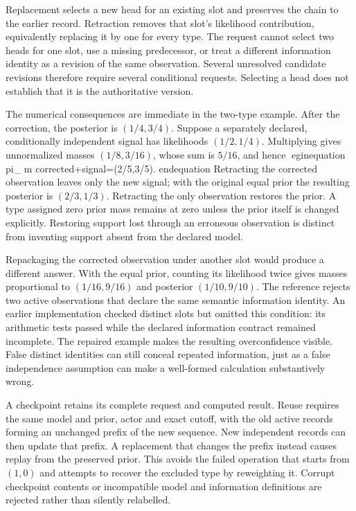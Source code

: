 Replacement selects a new head for an existing slot and preserves the chain
to the earlier record. Retraction removes that slot's likelihood contribution,
equivalently replacing it by one for every type. The request cannot select two
heads for one slot, use a missing predecessor, or treat a different information
identity as a revision of the same observation. Several unresolved candidate
revisions therefore require several conditional requests. Selecting a head
does not establish that it is the authoritative version.

The numerical consequences are immediate in the two-type example. After the
correction, the posterior is $(1/4,3/4)$. Suppose a separately declared,
conditionally independent signal has likelihoods $(1/2,1/4)$. Multiplying
gives unnormalized masses $(1/8,3/16)$, whose sum is $5/16$, and hence
egin{equation}
 pi_{
m corrected+signal}=(2/5,3/5).
end{equation}
Retracting the corrected observation leaves only the new signal; with the
original equal prior the resulting posterior is $(2/3,1/3)$. Retracting the
only observation restores the prior. A type assigned zero prior mass remains
at zero unless the prior itself is changed explicitly. Restoring support lost
through an erroneous observation is distinct from inventing support absent
from the declared model.

Repackaging the corrected observation under another slot would produce a
different answer. With the equal prior, counting its likelihood twice gives
masses proportional to $(1/16,9/16)$ and posterior $(1/10,9/10)$. The reference
rejects two active observations that declare the same semantic information
identity. An earlier implementation checked distinct slots but omitted this
condition: its arithmetic tests passed while the declared information
contract remained incomplete. The repaired example makes the resulting
overconfidence visible. False distinct identities can still conceal repeated
information, just as a false independence assumption can make a well-formed
calculation substantively wrong.

A checkpoint retains its complete request and computed result. Reuse requires
the same model and prior, actor and exact cutoff, with the old active records
forming an unchanged prefix of the new sequence. New independent records can
then update that prefix. A replacement that changes the prefix instead causes
replay from the preserved prior. This avoids the failed operation that starts
from $(1,0)$ and attempts to recover the excluded type by reweighting it.
Corrupt checkpoint contents or incompatible model and information definitions
are rejected rather than silently relabelled.

